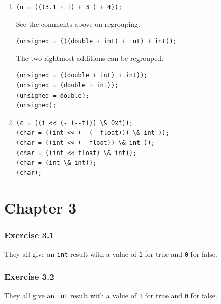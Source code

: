 \begin{enumerate}
    

    \item 
     \begin{Verbatim}
(u = (((3.1 + i) + 3 ) + 4));
\end{Verbatim}

     See the comments above on regrouping.


     \begin{Verbatim}
(unsigned = (((double + int) + int) + int));
\end{Verbatim}

     The two rightmost additions can be regrouped.


     \begin{Verbatim}
(unsigned = ((double + int) + int));
(unsigned = (double + int));
(unsigned = double);
(unsigned);
\end{Verbatim}

    

    \item 
     \begin{Verbatim}
(c = ((i << (- (--f))) \& 0xf));
(char = ((int << (- (--float))) \& int ));
(char = ((int << (- float)) \& int ));
(char = ((int << float) \& int));
(char = (int \& int));
(char);
\end{Verbatim}

    

   \end{enumerate}

  

 
        \section*{Chapter 3}
        

  

  \subsubsection*{Exercise 3.1}

   They all give an \texttt{int} result with a value of \texttt{1}
    for true and \texttt{0} for false.


  

  \subsubsection*{Exercise 3.2}

   They all give an \texttt{int} result with a value of \texttt{1}
    for true and \texttt{0} for false.



